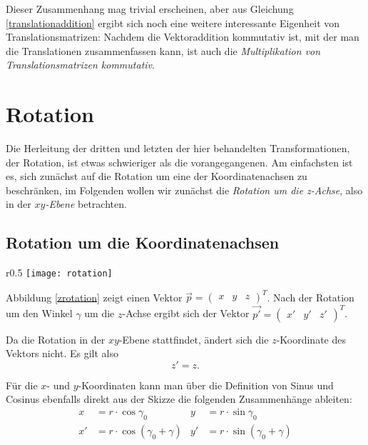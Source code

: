 Dieser Zusammenhang mag trivial erscheinen, aber aus Gleichung \ref{translationaddition} ergibt sich noch eine weitere interessante Eigenheit von Translationsmatrizen: Nachdem die Vektoraddition kommutativ ist, mit der man die Translationen zusammenfassen kann, ist auch die \emph{Multiplikation von Translationsmatrizen kommutativ}.

\section{Rotation}
Die Herleitung der dritten und letzten der hier behandelten Transformationen, der Rotation, ist etwas schwieriger als die vorangegangenen. Am einfachsten ist es, sich zunächst auf die Rotation um eine der Koordinatenachsen zu beschränken, im Folgenden wollen wir zunächst die \emph{Rotation um die z-Achse}, also in der \emph{$xy$-Ebene} betrachten.

\subsection{Rotation um die Koordinatenachsen}

\begin{wrapfigure}{r}{0.5\textwidth}
  \texttt{[image: rotation]}
  \vspace{-10pt}
  \caption{Rotation um die $z$-Achse.}
  \label{zrotation}
\end{wrapfigure}

Abbildung \ref{zrotation} zeigt einen Vektor $\vec p = \begin{pmatrix} x & y & z \end{pmatrix}^T$. Nach der Rotation um den Winkel $\gamma$ um die $z$-Achse ergibt sich der Vektor $\vec{p'} = \begin{pmatrix} x' & y' & z' \end{pmatrix}^T$.

Da die Rotation in der $xy$-Ebene stattfindet, ändert sich die $z$-Koordinate des Vektors nicht. Es gilt also
\begin{equation}
 z' = z.
\end{equation}

Für die $x$- und $y$-Koordinaten kann man über die Definition von Sinus und Cosinus ebenfalls direkt aus der Skizze die folgenden Zusammenhänge ableiten:
\begin{align}
  x &= r \cdot \cos{\gamma_0}            &   y &= r \cdot \sin{\gamma_0} \label{rot1} \\
 x' &= r \cdot \cos{(\gamma_0 + \gamma)} &  y' &= r \cdot \sin{(\gamma_0 + \gamma)} \label{rot2}
\end{align}

